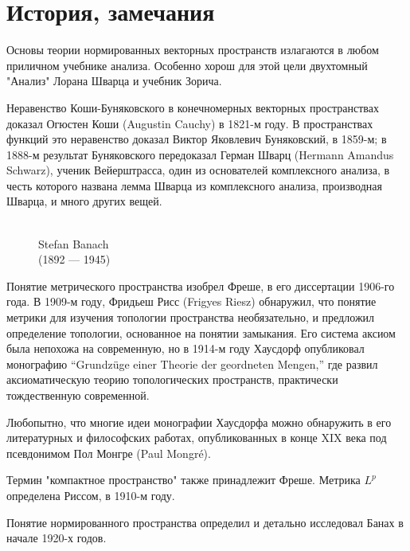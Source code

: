 \documentclass[12pt]{book}
\theoremstyle{upshape}
\theoremstyle{generic}
\theoremstyle{upshapenonumber}
\newcommand{\следствие}{%
     \refstepcounter{teorema}
     {\noindent\bf Следствие \thechapter.\arabic{teorema}:\ }}
\newcommand{\пример}{%
     \refstepcounter{teorema}
     {\noindent\bf Пример \thechapter.\arabic{teorema}:\ }}
\newcommand{\лемма}{%
     \refstepcounter{teorema}
     {\noindent\bf Лемма \thechapter.\arabic{teorema}:\ }}
\newcommand{\теорема}{%
     \refstepcounter{teorema}
     {\noindent\bf Теорема \thechapter.\arabic{teorema}:\ }}
\newcommand{\утверждение}{%
     \refstepcounter{teorema}
     {\noindent\bf Утверждение \thechapter.\arabic{teorema}:\ }}
\begin{document}

\section{История, замечания}


Основы теории нормированных векторных
пространств излагаются в любом приличном
учебнике анализа. Особенно хорош для этой цели
двухтомный "Анализ" Лорана Шварца и учебник Зорича.

Неравенство Коши-Буняковского
в конечномерных векторных пространствах доказал 
Огюстен Коши (Augustin Cauchy)
в 1821-м году. В пространствах функций это неравенство
доказал Виктор Яковлевич Буняковский, в 1859-м;
в 1888-м результат Буняковского передоказал 
Герман Шварц (Hermann Amandus Schwarz), ученик
Вейерштрасса, один из основателей комплексного анализа,
в честь которого названа лемма Шварца из комплексного
анализа, производная Шварца, и много других вещей.

\begin{figure}[ht]
\begin{center}
\\
Stefan Banach\\
(1892 --- 1945) 
\end{center}
\end{figure}


Понятие метрического пространства
изобрел Фреше, в его диссертации 1906-го года. 
В 1909-м году, Фридьеш Рисс  (Frigyes Riesz)
обнаружил, что понятие метрики для изучения
топологии пространства необязательно, и предложил
определение топологии, основанное на понятии замыкания.
Его система аксиом была непохожа на современную, 
но в 1914-м году Хаусдорф опубликовал монографию
``Grundz\"uge einer Theorie der geordneten Mengen,'' где 
развил аксиоматическую теорию топологических пространств, 
практически тождественную современной. 

Любопытно, что многие идеи монографии Хаусдорфа можно
обнаружить в его литературных и философских работах,
опубликованных в конце XIX века под псевдонимом Пол Монгре
(Paul Mongr\'e). 

Термин "компактное пространство" также принадлежит
Фреше. Метрика $L^p$ определена Риссом, в 1910-м году.

Понятие нормированного пространства определил и детально
исследовал Банах в начале 1920-х годов. 
\end{document}
